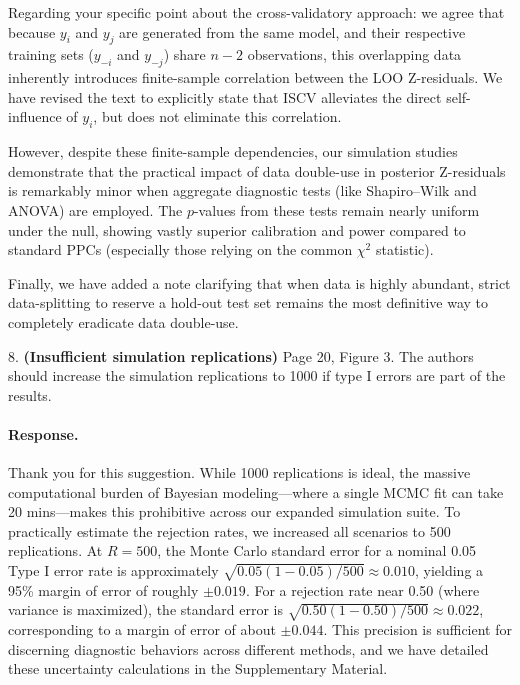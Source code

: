 \documentclass[11pt]{article}
\newcommand*{\mybox}[2]{\colorbox{#1!30}{\parbox{.98\linewidth}{#2}}}
\begin{document}
Regarding your specific point about the cross-validatory approach: we agree that because $y_i$ and $y_j$ are generated from the same model, and their respective training sets ($y_{-i}$ and $y_{-j}$) share $n-2$ observations, this overlapping data inherently introduces finite-sample correlation between the LOO Z-residuals. We have revised the text to explicitly state that ISCV alleviates the direct self-influence of $y_i$, but does not eliminate this correlation.

However, despite these finite-sample dependencies, our simulation studies demonstrate that the practical impact of data double-use in posterior Z-residuals is remarkably minor when aggregate diagnostic tests (like Shapiro--Wilk and ANOVA) are employed. The $p$-values from these tests remain nearly uniform under the null, showing vastly superior calibration and power compared to standard PPCs (especially those relying on the common $\chi^2$ statistic). 

Finally, we have added a note clarifying that when data is highly abundant, strict data-splitting to reserve a hold-out test set remains the most definitive way to completely eradicate data double-use.

\medskip

\mybox{gray}{8. \textbf{(Insufficient simulation replications)} Page 20, Figure 3. The authors should increase the simulation replications to 1000 if type I errors are part of the results.}

\paragraph{Response.}
Thank you for this suggestion. While 1000 replications is ideal, the massive computational burden of Bayesian modeling---where a single MCMC fit can take 20 mins---makes this prohibitive across our expanded simulation suite. To practically estimate the rejection rates, we increased all scenarios to 500 replications. At $R=500$, the Monte Carlo standard error for a nominal 0.05 Type I error rate is approximately $\sqrt{0.05(1-0.05)/500} \approx 0.010$, yielding a 95\% margin of error of roughly $\pm 0.019$. For a rejection rate near 0.50 (where variance is maximized), the standard error is $\sqrt{0.50(1-0.50)/500} \approx 0.022$, corresponding to a margin of error of about $\pm 0.044$. This precision is sufficient for discerning diagnostic behaviors across different methods, and we have detailed these uncertainty calculations in the Supplementary Material.
\end{document}
